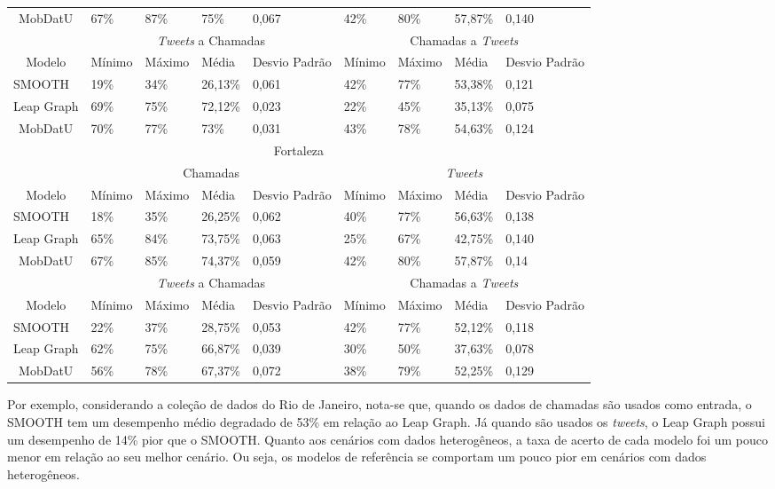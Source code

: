 \documentclass[10pt, a4paper, onecolumn, conference, compsocconf]{IEEEtran}
\begin{document}
\begin{table}[httt!]
\begin{tabular}{|c|p{1.0cm}|p{1.0cm}|p{1.0cm}|p{1.0cm}|p{1.0cm}|p{1.0cm}|p{1.0cm}|p{1.0cm}|}
\multicolumn{1}{|1|}{MobDatU} & 67\% & 87\% & 75\% & 0,067 & 42\% & 80\% & 57,87\% & 0,140\\ 
\cline{1-9} 
& \multicolumn{4}{|c|}{\textit{Tweets} a Chamadas} & \multicolumn{4}{|c|}{Chamadas a \textit{Tweets}} \\
\cline{2-9} 
Modelo & Mínimo & Máximo & Média & Desvio Padrão & Mínimo & Máximo & Média & Desvio Padrão \\
\hline
\multicolumn{1}{|l|}{SMOOTH} & 19\% & 34\% & 26,13\% & 0,061 & 42\% & 77\% & 53,38\% & 0,121 \\
\multicolumn{1}{|l|}{Leap Graph} & 69\% & 75\% & 72,12\% & 0,023 & 22\% & 45\% & 35,13\% & 0,075\\
\multicolumn{1}{|1|}{MobDatU} & 70\% & 77\% & 73\% & 0,031 & 43\% & 78\% & 54,63\% & 0,124\\ 
\cline{1-9}
\hline
\multicolumn{9}{|c|}{Fortaleza} \\ \hline
& \multicolumn{4}{|c|}{Chamadas} & \multicolumn{4}{|c|}{\textit{Tweets}} \\
\cline{2-9} 
Modelo & Mínimo & Máximo & Média & Desvio Padrão & Mínimo & Máximo & Média & Desvio Padrão \\
\hline
\multicolumn{1}{|l|}{SMOOTH} & 18\% & 35\% & 26,25\% & 0,062 & 40\% & 77\% & 56,63\% & 0,138\\
\multicolumn{1}{|l|}{Leap Graph} & 65\% & 84\% & 73,75\% & 0,063 & 25\% & 67\% & 42,75\% & 0,140\\
\multicolumn{1}{|1|}{MobDatU} & 67\% & 85\% & 74,37\% & 0,059 & 42\% & 80\% & 57,87\% & 0,14\\ 
\cline{1-9} 
& \multicolumn{4}{|c|}{\textit{Tweets} a Chamadas} & \multicolumn{4}{|c|}{Chamadas a \textit{Tweets}}  \\
\cline{2-9} 
Modelo & Mínimo & Máximo & Média & Desvio Padrão & Mínimo & Máximo & Média & Desvio Padrão \\
\hline
\multicolumn{1}{|l|}{SMOOTH} & 22\% & 37\% & 28,75\% & 0,053 & 42\% & 77\% & 52,12\% & 0,118 \\
\multicolumn{1}{|l|}{Leap Graph} & 62\% & 75\% & 66,87\% & 0,039 & 30\% & 50\% & 37,63\% & 0,078\\
\multicolumn{1}{|1|}{MobDatU} & 56\% & 78\% & 67,37\% & 0,072 & 38\% & 79\% & 52,25\% & 0,129\\ 
\cline{1-9}
\hline
\end{tabular}
\end{table}

Por exemplo, considerando  a coleção de dados do Rio de Janeiro, nota-se que,  quando os dados de chamadas são usados como entrada,  o SMOOTH tem um desempenho médio degradado de 53\% em relação ao Leap Graph. Já quando são usados os \textit{tweets}, o Leap Graph possui um desempenho de 14\% pior que o SMOOTH. Quanto aos cenários com dados heterogêneos, a taxa de acerto de cada modelo foi um pouco menor em relação ao  seu melhor cenário.  Ou seja, os modelos de referência se comportam um pouco pior em cenários com dados heterogêneos.  
\end{document}

